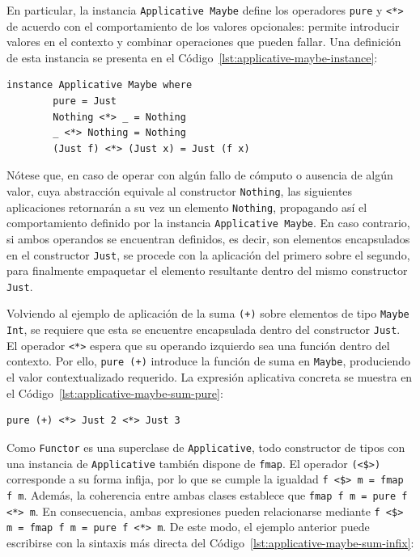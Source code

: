 En particular, la instancia \verb|Applicative Maybe| define los operadores \verb|pure| y \verb|<*>| de acuerdo con el comportamiento de los valores opcionales: permite introducir valores en el contexto y combinar operaciones que pueden fallar. Una definición de esta instancia se presenta en el Código~\ref{lst:applicative-maybe-instance}:

\begin{lstlisting}[style=haskell,caption={Instancia de \texttt{Applicative} para \texttt{Maybe}.},label={lst:applicative-maybe-instance}]
    instance Applicative Maybe where
        pure = Just
        Nothing <*> _ = Nothing
        _ <*> Nothing = Nothing
        (Just f) <*> (Just x) = Just (f x)
\end{lstlisting}

Nótese que, en caso de operar con algún fallo de cómputo o ausencia de algún valor, cuya abstracción equivale al constructor \verb|Nothing|, las siguientes aplicaciones retornarán a su vez un elemento \verb|Nothing|, propagando así el comportamiento definido por la instancia \verb|Applicative Maybe|. En caso contrario, si ambos operandos se encuentran definidos, es decir, son elementos encapsulados en el constructor \verb|Just|, se procede con la aplicación del primero sobre el segundo, para finalmente empaquetar el elemento resultante dentro del mismo constructor \verb|Just|.

Volviendo al ejemplo de aplicación de la suma \verb|(+)| sobre elementos de tipo \verb|Maybe Int|, se requiere que esta se encuentre encapsulada dentro del constructor \verb|Just|. El operador \verb|<*>| espera que su operando izquierdo sea una función dentro del contexto. Por ello, \verb|pure (+)| introduce la función de suma en \verb|Maybe|, produciendo el valor contextualizado requerido. La expresión aplicativa concreta se muestra en el Código~\ref{lst:applicative-maybe-sum-pure}:

\begin{lstlisting}[style=haskell,caption={Suma aplicativa de dos valores de tipo \texttt{Maybe Int}.},label={lst:applicative-maybe-sum-pure}]
    pure (+) <*> Just 2 <*> Just 3
\end{lstlisting}

Como \texttt{Functor} es una superclase de \texttt{Applicative}, todo constructor de tipos con una instancia de \texttt{Applicative} también dispone de \texttt{fmap}. El operador \verb|(<$>)| corresponde a su forma infija, por lo que se cumple la igualdad \verb|f <$> m = fmap f m|. Además, la coherencia entre ambas clases establece que \verb|fmap f m = pure f <*> m|. En consecuencia, ambas expresiones pueden relacionarse mediante \verb|f <$> m = fmap f m = pure f <*> m|. De este modo, el ejemplo anterior puede escribirse con la sintaxis más directa del Código~\ref{lst:applicative-maybe-sum-infix}:

